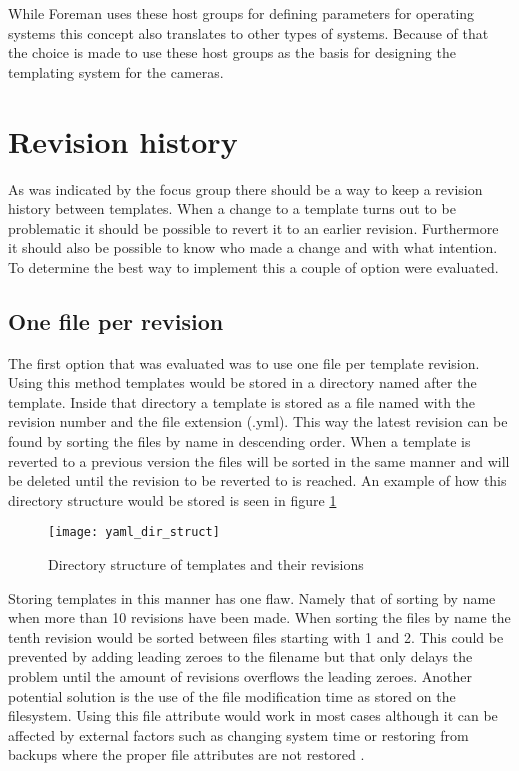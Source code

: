While Foreman uses these host groups for defining parameters for operating systems this concept also translates to other types of systems.
Because of that the choice is made to use these host groups as the basis for designing the templating system for the cameras.


\section{Revision history}
As was indicated by the focus group there should be a way to keep a revision history between templates.
When a change to a template turns out to be problematic it should be possible to revert it to an earlier revision.
Furthermore it should also be possible to know who made a change and with what intention.
To determine the best way to implement this a couple of option were evaluated.

\subsection{One file per revision}
The first option that was evaluated was to use one file per template revision.
Using this method templates would be stored in a directory named after the template.
Inside that directory a template is stored as a file named with the revision number and the file extension (.yml).
This way the latest revision can be found by sorting the files by name in descending order.
When a template is reverted to a previous version the files will be sorted in the same manner and will be deleted until the revision to be reverted to is reached. An example of how this directory structure would be stored is seen in figure \ref{fig:diskstruct}

\begin{figure}[h!]
	\centering
	\texttt{[image: yaml\_dir\_struct]}
	\caption{Directory structure of templates and their revisions}
	\label{fig:diskstruct}
\end{figure}

Storing templates in this manner has one flaw.
Namely that of sorting by name when more than 10 revisions have been made.
When sorting the files by name the tenth revision would be sorted between files starting with 1 and 2.
This could be prevented by adding leading zeroes to the filename but that only delays the problem until the amount of revisions overflows the leading zeroes.
Another potential solution is the use of the file modification time as stored on the filesystem.
Using this file attribute would work in most cases although it can be affected by external factors such as changing system time or restoring from backups where the proper file attributes are not restored \cite{noauthor_mtime_nodate}.

